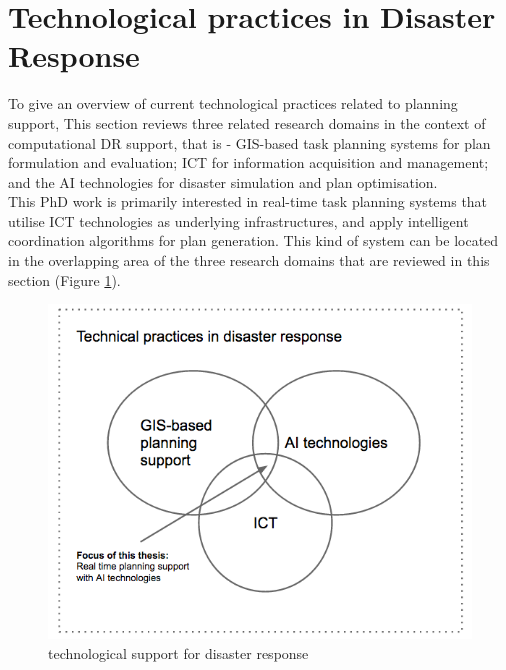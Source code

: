 \section{Technological practices in Disaster Response} \label{sec:LRApplicationAreas}
To give an overview of current technological practices related to planning support, This section reviews three related research domains in the context of computational DR support, that is - \ac{GIS}-based task planning systems for plan formulation and evaluation; \acf{ICT} for information acquisition and management; and the \acf{AI} technologies for disaster simulation and plan optimisation.  \\

This PhD work is primarily interested in real-time task planning systems that utilise \ac{ICT} technologies as underlying infrastructures, and apply intelligent coordination algorithms for plan generation. This kind of system can be located in the overlapping area of the three research domains that are  reviewed in this section (Figure \ref{fig:SystemFraming}).\\

\begin{figure}[h]
  \centering
  \includegraphics[width=1\textwidth]{img/Background/SystemFraming}
  \caption{technological support for disaster response}
  \label{fig:SystemFraming}
\end{figure} 

